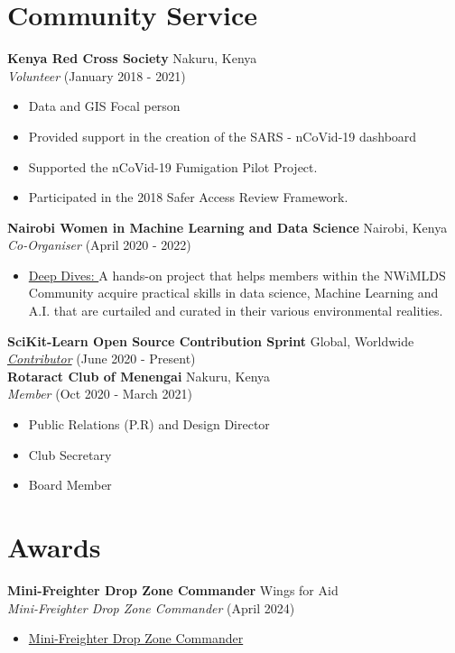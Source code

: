 \documentclass[line,margin,10pt]{res}
\begin{document}
\begin{resume}
\section{Community Service}
\textbf{Kenya Red Cross Society} \hfill Nakuru, Kenya\\
{\sl Volunteer} \hfill (January 2018 - 2021)
\begin{itemize} \itemsep -2pt
    \item Data and GIS Focal person
    \item Provided support in the creation of the SARS - nCoVid-19 dashboard
    \item Supported the nCoVid-19 Fumigation Pilot Project.
    \item Participated in the 2018 Safer Access Review Framework.
\end{itemize}
\textbf{Nairobi Women in Machine Learning and Data Science} \hfill Nairobi, Kenya\\
{\sl Co-Organiser} \hfill (April 2020 - 2022)
\begin{itemize} \itemsep -2pt
    \item \underline{Deep Dives: }
    A hands-on project that helps members within the NWiMLDS Community acquire practical skills in data science, Machine Learning and A.I. that are curtailed and curated in their various environmental realities.
\end{itemize}
\textbf{SciKit-Learn Open Source Contribution Sprint} \hfill Global, Worldwide\\
{\sl \href{https://sites.google.com/view/nyc-2020-scikit-sprint/contributors}{Contributor}} \hfill (June 2020 - Present) \\
\textbf{Rotaract Club of Menengai} \hfill Nakuru, Kenya\\
{\sl Member} \hfill (Oct 2020 - March 2021)
\begin{itemize} \itemsep -2pt
    \item Public Relations (P.R) and Design Director
    \item Club Secretary
    \item Board Member
\end{itemize}
{\vspace{-0,25cm}}

\section{Awards}

\textbf{Mini-Freighter Drop Zone Commander} \hfill Wings for Aid\\
{\sl Mini-Freighter Drop Zone Commander} \hfill (April 2024)
\begin{itemize} \itemsep -2pt
    \item \href{https://eu1.documents.adobe.com/public/agreements/view/CBJCHBCAABAAo6EysFkkqA1ey7U1NxoaUMuCQWBD2O_j?type=esign&tsid=CBFCIBAACBSCTBABDUAAABACAABAA8ODh1Bs2tN-cEUzSBNJroR8RWzTYY75BIhLtxFRDbIu8Jewrp6hgiaU25vKXNbO182DWtA--BTfJqve1kL8imSkgsNd0UarFi8_7LTvA0_COfTYD465w0IjtVBvhxc2Y}{Mini-Freighter Drop Zone Commander}
\end{itemize}


\end{resume}
\end{document}
